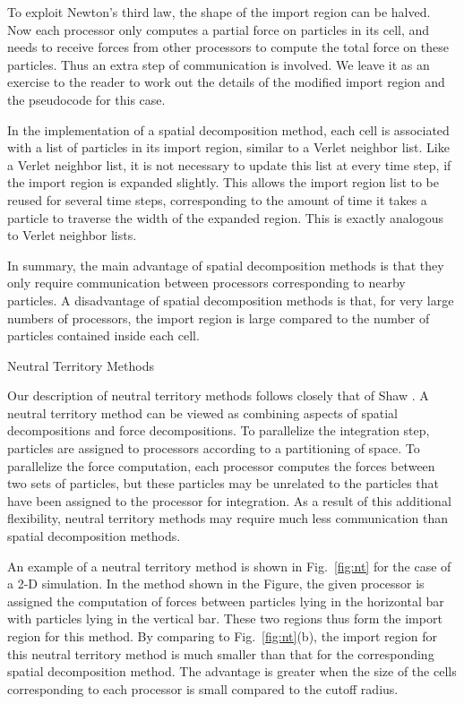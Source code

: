 To exploit Newton's third law, the shape of the import region can be halved.
Now each processor only computes a partial force on particles in its cell, and 
needs to receive forces from other processors to compute the total force
on these particles.  Thus an extra step of communication is involved.
We leave it as an exercise to the reader to work out the details of the
modified import region and the pseudocode for this case.

In the implementation of a spatial decomposition method, each cell is
associated with a list of particles in its import region, similar to a 
Verlet neighbor list.  Like a Verlet neighbor list, it is not necessary
to update this list at every time step, if the import region is expanded
slightly.  This allows the import region list to be reused for several
time steps, corresponding to the amount of time it takes a particle 
to traverse the width of the expanded region.  This is exactly analogous
to Verlet neighbor lists.

In summary, the main advantage of spatial decomposition methods is
that they only require communication between processors corresponding
to nearby particles.  A disadvantage of spatial decomposition methods
is that, for very large numbers of processors, the import region
is large compared to the number of particles contained inside each cell.

 {Neutral Territory Methods}

Our description of neutral territory methods follows closely
that of Shaw \cite{shaw}.  
A neutral territory method can be viewed as combining aspects of
spatial decompositions and force decompositions.  To parallelize
the integration step, particles are assigned to processors 
according to a partitioning of space.  To parallelize the 
force computation, each processor computes the forces between
two sets of particles, but these particles may be unrelated
to the particles that have been assigned to the processor for
integration.  As a result of this additional flexibility,
neutral territory methods may require much less communication
than spatial decomposition methods.

An example of a neutral territory method is shown in Fig.~\ref{fig:nt}
for the case of a 2-D simulation.
In the method shown in the Figure, the given processor is assigned
the computation of forces between particles lying in the horizontal
bar with particles lying in the vertical bar.  These two regions thus
form the import region for this method.  By comparing to Fig.~\ref{fig:nt}(b),
the import region for this neutral territory method is much smaller
than that for the corresponding spatial decomposition method.
The advantage is greater when the size of the cells corresponding to
each processor is small compared to the cutoff radius.

